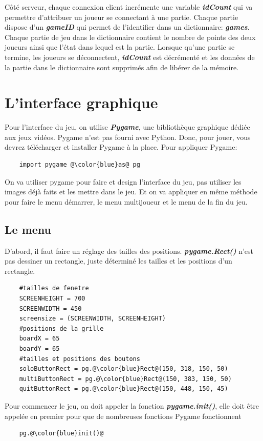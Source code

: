 \documentclass[a4paper]{report}
\begin{document}
Côté serveur, chaque connexion client incrémente une variable \textbf{\textit{idCount}} qui va permettre d'attribuer un joueur se connectant à une partie. Chaque partie dispose d'un \textbf{\textit{gameID}} qui permet de l'identifier dans un dictionnaire: \textbf{\textit{games}}. Chaque partie de jeu dans le dictionnaire contient le nombre de points des deux joueurs ainsi que l'état dans lequel est la partie. Lorsque qu'une partie se termine, les joueurs se déconnectent, \textbf{\textit{idCount}} est décrémenté et les données de la partie dans le dictionnaire sont supprimés afin de libérer de la mémoire.


\section{L'interface graphique}
Pour l'interface du jeu, on utilise \textbf{\textit{Pygame}}, une bibliothèque graphique dédiée aux jeux vidéos. 
Pygame n'est pas fourni avec Python. Donc, pour jouer, vous devrez télécharger et installer Pygame à la place. Pour appliquer Pygame:
\begin{lstlisting}
    import pygame @\color{blue}as@ pg
\end{lstlisting}

On va utiliser pygame pour faire et design l'interface du jeu, pas utiliser les images déjà faits et les mettre dans le jeu.
Et on va appliquer en même méthode pour faire le menu démarrer, le menu multijoueur et le menu de la fin du jeu.

\subsection{Le menu}
D'abord, il faut faire un réglage des tailles des positions. \textbf{\textit{pygame.Rect()}} n'est pas dessiner un rectangle, juste déterminé les tailles et les positions d'un rectangle.
\begin{lstlisting}
    #tailles de fenetre
    SCREENHEIGHT = 700
    SCREENWIDTH = 450
    screensize = (SCREENWIDTH, SCREENHEIGHT)
    #positions de la grille
    boardX = 65
    boardY = 65
    #tailles et positions des boutons
    soloButtonRect = pg.@\color{blue}Rect@(150, 318, 150, 50)
    multiButtonRect = pg.@\color{blue}Rect@(150, 383, 150, 50)
    quitButtonRect = pg.@\color{blue}Rect@(150, 448, 150, 45)
\end{lstlisting}

Pour commencer le jeu, on doit appeler la fonction \textbf{\textit{pygame.init()}}, elle doit être appelée en premier pour que de nombreuses fonctions Pygame fonctionnent
\begin{lstlisting}
    pg.@\color{blue}init()@
\end{lstlisting}
\end{document}
